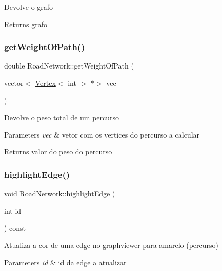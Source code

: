 Devolve o grafo \begin{DoxyReturn}{Returns}
grafo 
\end{DoxyReturn}
\mbox{\label{class_road_network_a66f44792ce48ef5b11a4f3871e7f0627}} 
\subsubsection{\texorpdfstring{get\+Weight\+Of\+Path()}{getWeightOfPath()}}
{\footnotesize\ttfamily double Road\+Network\+::get\+Weight\+Of\+Path (\begin{DoxyParamCaption}\item[{vector$<$ \mbox{\hyperlink{class_vertex}{Vertex}}$<$ int $>$ $\ast$$>$}]{vec }\end{DoxyParamCaption})}

Devolve o peso total de um percurso 
\begin{DoxyParams}{Parameters}
{\em vec} & vetor com os vertices do percurso a calcular \\
\hline
\end{DoxyParams}
\begin{DoxyReturn}{Returns}
valor do peso do percurso 
\end{DoxyReturn}
\mbox{\label{class_road_network_aae482bce48ecbd4487306e72d9e77f28}} 
\subsubsection{\texorpdfstring{highlight\+Edge()}{highlightEdge()}}
{\footnotesize\ttfamily void Road\+Network\+::highlight\+Edge (\begin{DoxyParamCaption}\item[{int}]{id }\end{DoxyParamCaption}) const}

Atualiza a cor de uma edge no graphviewer para amarelo (percurso) 
\begin{DoxyParams}{Parameters}
{\em id} & id da edge a atualizar \\
\hline
\end{DoxyParams}
\mbox{\label{class_road_network_aaab4512e908b04bd6e71ce828a22034d}} 
